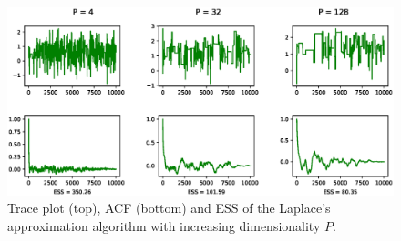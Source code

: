 \documentclass{article}
\begin{document}
\begin{figure}[H]
    \centering
    \includegraphics[width=\textwidth]{plots/Laplace.eps}
    \caption{Trace plot (top), ACF (bottom) and ESS of the Laplace's approximation algorithm with increasing dimensionality \(P\).}
    \label{fig:Laplace}
\end{figure}
\end{document}

